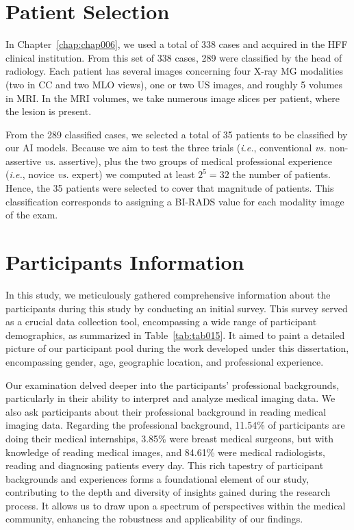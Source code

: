 \section{Patient Selection}
\label{sec:app005010}

In Chapter~\ref{chap:chap006}, we used a total of 338 cases and acquired in the \ac{HFF} clinical institution.
From this set of 338 cases, 289 were classified by the head of radiology.
Each patient has several images concerning four X-ray \ac{MG} modalities (two in \ac{CC} and two \ac{MLO} views), one or two US images, and roughly 5 volumes in \ac{MRI}.
In the \ac{MRI} volumes, we take numerous image slices per patient, where the lesion is present.

From the 289 classified cases, we selected a total of 35 patients to be classified by our \ac{AI} models.
Because we aim to test the three trials ({\it i.e.}, conventional {\it vs.} non-assertive {\it vs.} assertive), plus the two groups of medical professional experience ({\it i.e.}, novice {\it vs.} expert) we computed at least $2^5=32$ the number of patients.
Hence, the 35 patients were selected to cover that magnitude of patients.
This classification corresponds to assigning a \ac{BI-RADS} value for each modality image of the exam.

\section{Participants Information}
\label{sec:app005011}

\textcolor{revised}{In this study, we meticulously gathered comprehensive information about the participants during this study by conducting an initial survey.
This survey served as a crucial data collection tool, encompassing a wide range of participant demographics, as summarized in Table~\ref{tab:tab015}.
It aimed to paint a detailed picture of our participant pool during the work developed under this dissertation, encompassing gender, age, geographic location, and professional experience.}

\textcolor{revised}{Our examination delved deeper into the participants' professional backgrounds, particularly in their ability to interpret and analyze medical imaging data.}
We also ask participants about their professional background in reading medical imaging data.
Regarding the professional background, 11.54\% of participants are doing their medical internships, 3.85\% were breast medical surgeons, but with knowledge of reading medical images, and 84.61\% were medical radiologists, reading and diagnosing patients every day.
\textcolor{revised}{This rich tapestry of participant backgrounds and experiences forms a foundational element of our study, contributing to the depth and diversity of insights gained during the research process.
It allows us to draw upon a spectrum of perspectives within the medical community, enhancing the robustness and applicability of our findings.}

